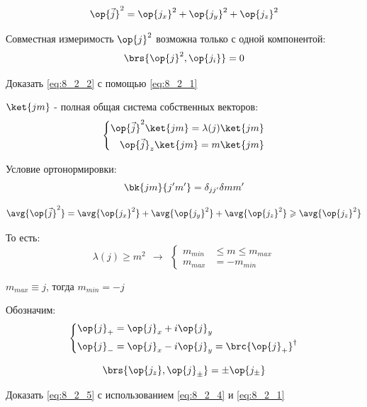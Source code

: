 $$
\op{\vec{j}}^2 = \op{j_x}^2 + \op{j_y}^2 + \op{j_z}^2
$$

Совместная измеримость $\op{j}^2$ возможна только с одной компонентой:
\begin{equation}
\label{eq:8_2_2}
\brs{\op{j}^2, \op{j_i}} = 0
\end{equation}

\begin{excr}
Доказать \eqref{eq:8_2_2} с помощью \eqref{eq:8_2_1}
\end{excr}

$\ket{jm}$ - полная общая система собственных векторов:
\begin{equation}
\label{eq:8_2_3}
\left\{
\begin{aligned}
\op{\vec{j}}^2 \ket{jm} = \lambda(j) \ket{jm} \\
\op{\vec{j}}_z \ket{jm} = m \ket{jm}
\end{aligned}
\right.
\end{equation}

Условие ортонормировки:
$$
\bk{jm}{j'm'} = \delta_{jj'} \delta{mm'}
$$

$$
\avg{\op{\vec{j}}^2} = \avg{\op{j_x}^2} + \avg{\op{j_y}^2} + \avg{\op{j_z}^2} \geqslant \avg{\op{j_z}^2}
$$

То есть:
$$
\lambda(j) \geqslant m^2 ~~\rightarrow~~ \left\{
\begin{aligned}
m_{min} &\leqslant m \leqslant m_{max}\\
m_{max} &= - m_{min}
\end{aligned}
\right.
$$

$m_{max} \equiv j$, тогда $m_{min} = -j$

Обозначим:
\begin{equation}
\label{eq:8_2_4}
\left\{
\begin{aligned}
\op{j}_{+} &= \op{j}_{x} + i \op{j}_{y} \\
\op{j}_{-} &= \op{j}_{x} - i \op{j}_{y} = \brc{\op{j}_{+}}^\dag
\end{aligned}
\right.
\end{equation}

\begin{equation}
\label{eq:8_2_5}
\brs{\op{j_z}, \op{j}_{\pm}} = \pm \op{j_{\pm}}
\end{equation}

\begin{excr}
Доказать \eqref{eq:8_2_5} с использованием \eqref{eq:8_2_4} и \eqref{eq:8_2_1}
\end{excr}

